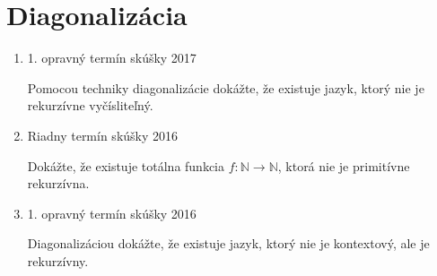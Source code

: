 \documentclass[11pt,a4paper]{article}
\begin{document}
	\section{Diagonalizácia}

	\begin{enumerate}
		\item 1. opravný termín skúšky 2017

		Pomocou techniky diagonalizácie dokážte, že existuje jazyk, ktorý nie je rekurzívne vyčísliteľný.

		\item Riadny termín skúšky 2016

		Dokážte, že existuje totálna funkcia $f: \mathbb{N} \rightarrow \mathbb{N}$, ktorá nie je primitívne rekurzívna.

		\item 1. opravný termín skúšky 2016

		Diagonalizáciou dokážte, že existuje jazyk, ktorý nie je kontextový, ale je rekurzívny.

	\end{enumerate}
\end{document}
